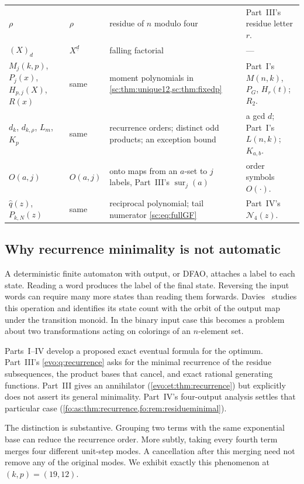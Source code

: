 \documentclass[11pt,a4paper]{article}
\numberwithin{equation}{section}
\theoremstyle{definition}
\theoremstyle{remark}
\newcommand{\fall}[2]{(#1)_{#2}}
\newcommand{\sur}{\operatorname{sur}}
\begin{document}
{\begin{longtable}{>{\raggedright}p{.16\linewidth}>{\raggedright}p{.13\linewidth}>{\raggedright}p{.33\linewidth}>{\raggedright\arraybackslash}p{.26\linewidth}}
$\rho$ & $\rho$ & residue of $n$ modulo four & Part~III's residue letter $r$.\\
$\fall{X}{d}$ & $X^{\underline d}$ & falling factorial & ---\\
$M_j(k,p)$, $P_j(x)$, $H_{p,j}(X)$, $R(x)$ & same & moment polynomials in \cref{sc:thm:unique12,sc:thm:fixedp} & Part~I's $M(n,k)$, $P_G$, $H_r(t)$; $R_2$.\\
$d_k$, $d_{k,\rho}$, $L_m$, $K_p$ & same & recurrence orders; distinct odd products; an exception bound & a gcd $d$; Part~I's $L(n,k)$; $K_{a,b}$.\\
$O(a,j)$ & $O(a,j)$ & onto maps from an $a$-set to $j$ labels, Part~III's $\sur_j(a)$ & order symbols $O(\cdot)$.\\
$\widehat q(z)$, $P_{k,N}(z)$ & same & reciprocal polynomial; tail numerator \eqref{sc:eq:fullGF} & Part~IV's $\mathcal N_4(z)$.\\
\end{longtable}}

\subsection{Why recurrence minimality is not automatic}
A deterministic finite automaton with output, or DFAO, attaches a label to
each state. Reading a word produces the label of the final state. Reversing
the input words can require many more states than reading them forwards.
Davies~\cite{Davies2017} studies this operation and identifies its state count
with the orbit of the output map under the transition monoid. In the binary
input case this becomes a problem about two transformations acting on
colorings of an $n$-element set.

Parts~I--IV develop a proposed exact eventual formula for the optimum.
Part~III's \cref{evo:q:recurrence} asks for the minimal recurrence of the
residue subsequences, the product bases that cancel, and exact rational
generating functions. Part~III gives an annihilator
(\cref{evo:et:thm:recurrence}) but explicitly does not assert its general
minimality. Part~IV's four-output analysis settles that particular case
(\cref{fo:as:thm:recurrence,fo:rem:residueminimal}).

The distinction is substantive. Grouping two terms with the same
exponential base can reduce the recurrence order. More subtly, taking every
fourth term merges four different unit-step modes. A cancellation after
this merging need not remove any of the original modes. We exhibit exactly
this phenomenon at $(k,p)=(19,12)$.
\end{document}

